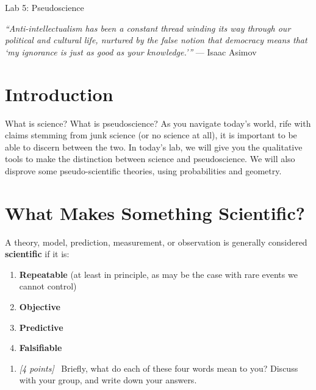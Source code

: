 \documentclass[11pt]{article}
\newcommand{\pts}[1]{\textit{[#1 points]}\ }
\begin{document}
\begin{center}
\huge{Lab 5: Pseudoscience}\\ 
\end{center}
\medskip

\noindent\textit{``Anti-intellectualism has been a constant thread winding its
way through our political and cultural life, nurtured by the false notion
that democracy means that `my ignorance is just as good as your
knowledge.'''} --- Isaac Asimov


\section{Introduction}
What is science? What is pseudoscience? As you navigate today's world, rife with claims stemming from junk science (or no science at all), it is important to be able to discern between the two. In today's lab, we will give you the qualitative tools to make the distinction between science and pseudoscience. We will also disprove some pseudo-scientific theories, using probabilities and geometry.

\section{What Makes Something Scientific?}
\label{sec:what_makes_something_scientific}

A theory, model, prediction, measurement, or observation is generally
considered \textbf{scientific} if it is:

\begin{enumerate}[label=(\alph*)]
    \item \textbf{Repeatable} (at least in principle, as may be the case with rare events we cannot control)
    \item \textbf{Objective}
    \item \textbf{Predictive}
    \item \textbf{Falsifiable}
\end{enumerate}

\begin{enumerate}
    \item \pts{4} Briefly, what do each of these four words mean to you? Discuss with your group, and write down your answers.
\end{enumerate}
\end{document}
